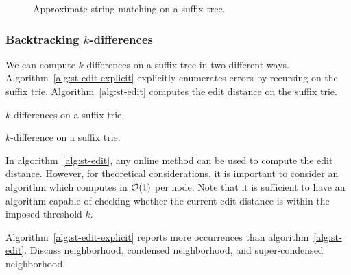 \begin{figure}[h]
\begin{center}
\caption{Approximate string matching on a suffix tree.}
\label{fig:st-hamming}

\end{center}
\end{figure}

\subsubsection{Backtracking $k$-differences}

We can compute $k$-differences on a suffix tree in two different ways. Algorithm~\ref{alg:st-edit-explicit} explicitly enumerates errors by recursing on the suffix trie. Algorithm~\ref{alg:st-edit} computes the edit distance on the suffix trie.

\begin{algorithm}[h]
\caption{$k$-differences on a suffix trie.}
\label{alg:st-edit-explicit}
\begin{algorithmic}[1]
		\State {}
	\Else 
		\State {}
		\ForAll {$\Cn \in \Ci(\Tn)$}
			\State {}
				\State {}
			\Else
				\State {}
			\EndIf
		\EndFor
	\EndIf
\EndProcedure
\end{algorithmic}
\end{algorithm}

\begin{algorithm}[h]
\caption{$k$-difference on a suffix trie.}
\label{alg:st-edit}
\begin{algorithmic}[1]
	\ForAll {$\Cn \in \Ci(\Tn)$}
		\State {}
	\EndFor
\EndProcedure
\end{algorithmic}
\end{algorithm}

In algorithm~\ref{alg:st-edit}, any online method can be used to compute the edit distance.
However, for theoretical considerations, it is important to consider an algorithm which computes in $\mathcal{O}(1)$ per node.
Note that it is sufficient to have an algorithm capable of checking whether the current edit distance is within the imposed threshold $k$.

Algorithm~\ref{alg:st-edit-explicit} reports more occurrences than algorithm~\ref{alg:st-edit}.
Discuss neighborhood, condensed neighborhood, and super-condensed neighborhood.

